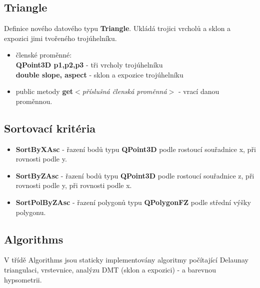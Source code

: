 \documentclass[a4paper, 12pt]{article}
\begin{document}
\subsection{Triangle}
Definice nového datového typu \textbf{Triangle}. Ukládá trojici vrcholů a sklon a expozici jimi tvořeného trojúhelníku.

\begin{itemize}
	\item členské proměnné:\\ \textbf{QPoint3D p1,p2,p3} - tři vrcholy trojúhelníku \\
	\textbf{double slope, aspect} - sklon a expozice trojúhelníku
	\item public metody \textbf{get$<$}\textit{příslušná členská proměnná}\textbf{$>$} - vrací danou proměnnou.
\end{itemize}

\subsection{Sortovací kritéria}
\begin{itemize}
\item \textbf{SortByXAsc} - řazení bodů typu \textbf{QPoint3D} podle rostoucí souřadnice x, při rovnosti podle y.
\item \textbf{SortByZAsc} - řazení bodů typu \textbf{QPoint3D} podle rostoucí souřadnice z, při rovnosti podle y, při rovnosti podle x.
\item \textbf{SortPolByZAsc} - řazení polygonů typu \textbf{QPolygonFZ} podle střední výšky polygonu.
\end{itemize}


\subsection{Algorithms}
V třídě Algorithms jsou staticky implementovány algoritmy počítající Delaunay triangulaci, vrstevnice, analýzu DMT (sklon a expozici) - a barevnou hypsometrii. 
\end{document}
